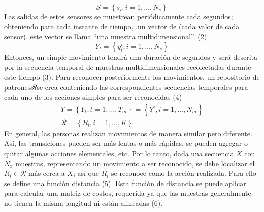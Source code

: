 \documentclass[10pt]{article}
\begin{document}
$$
\mathcal{S}=\left\{s_{i}, i=1, \ldots, N_{s}\right\}
$$
Las salidas de estos sensores se muestrean periódicamente cada    segundos; obteniendo para cada instante de tiempo,  ,un vector de    (cada valor de cada sensor). este vector    se llama “una muestra multidimensional”. (2) 
$$
Y_{t}=\left\{y_{t}^{i}, i=1, \ldots, N_{s}\right\}
$$
Entonces, un simple movimiento  tendrá una duración de    segundos y será descrita por la secuencia temporal de    muestras multidimensionales recolectadas durante este tiempo (3). Para reconocer posteriormente los movimientos, un repositorio de patronesℛse crea conteniendo las correspondientes secuencias temporales para cada uno de los  acciones simples para ser reconocidas (4)
$$
\begin{gathered}
Y=\left\{Y_{t}, t=1, \ldots, T_{m}\right\}=\left\{Y^{i}, i=1, \ldots, N_{m}\right\} \\
\mathcal{R}=\left\{R_{i}, i=1, \ldots, K\right\}
\end{gathered}
$$
En general, las personas realizan movimientos de manera similar pero diferente. Así, las transiciones pueden ser más lentas o más rápidas, se pueden agregar o quitar algunas acciones elementales, etc.  Por lo tanto, dada una secuencia $X$ con $N_{x}$ muestras, representando un movimiento a ser reconocido, se debe localizar el $R_{i} \in \mathcal{R}$ más cerca a $X$; así que $R_{i}$ se reconoce como la acción realizada. Para ello se define una función distancia (5). Esta función de distancia se puede aplicar para calcular una matriz de costos, requerida ya que las muestras generalmente no tienen la misma longitud ni están alineadas (6).
\end{document}

